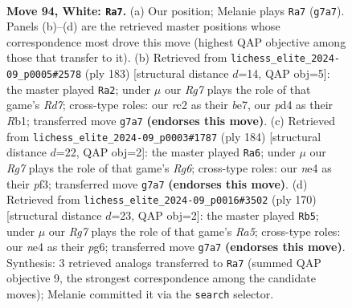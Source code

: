 \documentclass[11pt]{article}
\begin{document}
\clearpage

\begin{figure}[p]\centering
\begin{subfigure}{0.46\textwidth}\centering
\resizebox{\linewidth}{!}{%
\newchessgame
\chessboard[
  setfen={8/6R1/7p/4pk2/1K1pn2b/8/2r5/8 w - - 6 94},
  showmover=false,
  pgfstyle=straightmove, color=movearrow, markmove={g7-a7}
]}
\caption{}
\end{subfigure}\hfill
\begin{subfigure}{0.46\textwidth}\centering
\resizebox{\linewidth}{!}{%
\newchessgame
\chessboard[
  setfen={8/4B1k1/8/4P3/4KNB1/8/3r4/1r6 b - - 58 92},
  showmover=false,
  pgfstyle=straightmove, color=movearrow, markmove={d2-a2}
]}
\caption{}
\end{subfigure}
\\[4pt]
\begin{subfigure}{0.46\textwidth}\centering
\resizebox{\linewidth}{!}{%
\newchessgame
\chessboard[
  setfen={8/8/6R1/5p2/5k2/5p2/1r6/4K3 w - - 42 93},
  showmover=false,
  pgfstyle=straightmove, color=movearrow, markmove={g6-a6}
]}
\caption{}
\end{subfigure}\hfill
\begin{subfigure}{0.46\textwidth}\centering
\resizebox{\linewidth}{!}{%
\newchessgame
\chessboard[
  setfen={8/8/5kp1/R7/5P1p/3r4/5K2/8 w - - 0 86},
  showmover=false,
  pgfstyle=straightmove, color=movearrow, markmove={a5-b5}
]}
\caption{}
\end{subfigure}
\caption{\textbf{Move 94, White: \texttt{Ra7}.} (a) Our position; Melanie plays \texttt{Ra7} (\texttt{g7a7}). Panels (b)--(d) are the retrieved master positions whose correspondence most drove this move (highest QAP objective among those that transfer to it). (b) Retrieved from \texttt{lichess\_elite\_2024-09\_p0005\#2578} (ply 183) [structural distance $d$=14, QAP obj=5]: the master played \texttt{Ra2}; under $\mu$ our \emph{Rg7} plays the role of that game's \emph{Rd7}; cross-type roles: our \emph{r}c2 as their \emph{b}e7, our \emph{p}d4 as their \emph{R}b1; transferred move \texttt{g7a7} \textbf{(endorses this move)}. (c) Retrieved from \texttt{lichess\_elite\_2024-09\_p0003\#1787} (ply 184) [structural distance $d$=22, QAP obj=2]: the master played \texttt{Ra6}; under $\mu$ our \emph{Rg7} plays the role of that game's \emph{Rg6}; cross-type roles: our \emph{n}e4 as their \emph{p}f3; transferred move \texttt{g7a7} \textbf{(endorses this move)}. (d) Retrieved from \texttt{lichess\_elite\_2024-09\_p0016\#3502} (ply 170) [structural distance $d$=23, QAP obj=2]: the master played \texttt{Rb5}; under $\mu$ our \emph{Rg7} plays the role of that game's \emph{Ra5}; cross-type roles: our \emph{n}e4 as their \emph{p}g6; transferred move \texttt{g7a7} \textbf{(endorses this move)}. Synthesis: 3 retrieved analogs transferred to \texttt{Ra7} (summed QAP objective 9, the strongest correspondence among the candidate moves); Melanie committed it via the \texttt{search} selector.}
\label{fig:thought-m186}
\end{figure}
\end{document}
